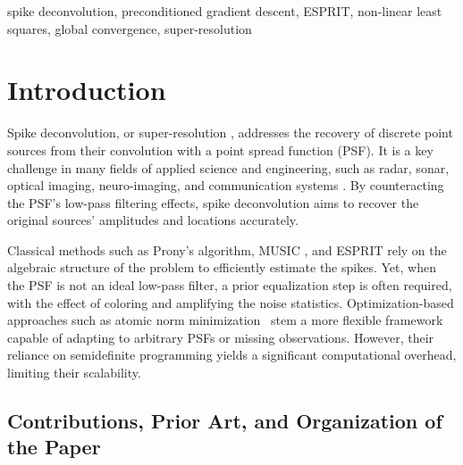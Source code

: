 \documentclass[conference,english]{IEEEtran}
\begin{document}
\begin{IEEEkeywords}
spike deconvolution, preconditioned gradient descent, ESPRIT, non-linear least squares, global convergence, super-resolution
\end{IEEEkeywords}

\section{Introduction}

Spike deconvolution, or super-resolution \cite{donoho1992superresolution}, addresses the recovery of discrete point sources from their convolution with a point spread function (PSF). It is a key challenge in many fields of applied science and engineering, such as radar, sonar, optical imaging, neuro-imaging, and communication systems \cite{potter2010sparsity, zhu2016super, zhu2012faster, berger2010sparse}. By counteracting the PSF's low-pass filtering effects, spike deconvolution aims to recover the original sources’ amplitudes and locations accurately.

Classical methods such as Prony’s algorithm, MUSIC \cite{schmidt1986multiple, liao2016music}, and ESPRIT \cite{roy1989esprit} rely on the algebraic structure of the problem to efficiently estimate the spikes. Yet, when the PSF is not an ideal low-pass filter, a prior equalization step is often required, with the effect of coloring and amplifying the noise statistics. Optimization-based approaches such as atomic norm minimization~\cite{decastro2012exact, tang2013compressed, candes2014towards, chi2020harnessing} stem a more flexible framework capable of adapting to arbitrary PSFs or missing observations. However, their reliance on semidefinite programming yields a significant computational overhead, limiting their scalability.

\subsection{Contributions, Prior Art, and Organization of the Paper}
\end{document}
